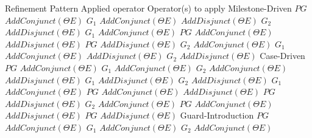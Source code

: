 
{
\setupTABLE[r][1][style=bold,align=middle]
\setupTABLE[c][1][align={middle,lohi}]
\setupTABLE[c][each][loffset=1pt,roffset=1pt]
\bTABLE															
\bTABLEhead																								
\bTR	\bTD	Refinement Pattern	\eTD	\bTD[nc=2]		Applied operator		\eTD						\bTD[nc=2]		Operator(s) to apply		\eTD						\eTR
\eTABLEhead																								
\bTABLEbody																					
\bTR	\bTD[nr=6]	\dontleavehmode{} Milestone-Driven 	\eTD	\bTD[nr=2]	$	PG	$	\eTD	\bTD	$	AddConjunct(\Theta E)	$	\eTD	\bTD	$	G_1	$	\eTD	\bTD	$	AddConjunct(\Theta E)	$	\eTD	\eTR
\bTR									\bTD	$	AddDisjunct(\Theta E)	$	\eTD	\bTD	$	G_2	$	\eTD	\bTD	$	AddDisjunct(\Theta E)	$	\eTD	\eTR
\bTR				\bTD[nr=2]	$	G_1	$	\eTD	\bTD	$	AddConjunct(\Theta E)	$	\eTD	\bTD	$	PG	$	\eTD	\bTD	$	AddConjunct(\Theta E)	$	\eTD	\eTR
\bTR									\bTD	$	AddDisjunct(\Theta E)	$	\eTD	\bTD	$	PG	$	\eTD	\bTD	$	AddDisjunct(\Theta E)	$	\eTD	\eTR
\bTR				\bTD[nr=2]	$	G_2	$	\eTD	\bTD	$	AddConjunct(\Theta E)	$	\eTD	\bTD	$	G_1	$	\eTD	\bTD	$	AddConjunct(\Theta E)	$	\eTD	\eTR
\bTR									\bTD	$	AddDisjunct(\Theta E)	$	\eTD	\bTD	$	G_2	$	\eTD	\bTD	$	AddDisjunct(\Theta E)	$	\eTD	\eTR
\bTR	\bTD[nr=8] \dontleavehmode{}	Case-Driven 		\eTD	\bTD[nr=4]	$	PG	$	\eTD	\bTD[nr=2]	$	AddConjunct(\Theta E)	$	\eTD	\bTD	$	G_1	$	\eTD	\bTD	$	AddConjunct(\Theta E)	$	\eTD	\eTR
\bTR														\bTD	$	G_2	$	\eTD	\bTD	$	AddConjunct(\Theta E)	$	\eTD	\eTR
\bTR									\bTD[nr=2]	$	AddDisjunct(\Theta E)	$	\eTD	\bTD	$	G_1	$	\eTD	\bTD	$	AddDisjunct(\Theta E)	$	\eTD	\eTR
\bTR														\bTD	$	G_2	$	\eTD	\bTD	$	AddDisjunct(\Theta E)	$	\eTD	\eTR
\bTR				\bTD[nr=2]	$	G_1	$	\eTD	\bTD	$	AddConjunct(\Theta E)	$	\eTD	\bTD	$	PG	$	\eTD	\bTD	$	AddConjunct(\Theta E)	$	\eTD	\eTR
\bTR									\bTD	$	AddDisjunct(\Theta E)	$	\eTD	\bTD	$	PG	$	\eTD	\bTD	$	AddDisjunct(\Theta E)	$	\eTD	\eTR
\bTR				\bTD[nr=2]	$	G_2	$	\eTD	\bTD	$	AddConjunct(\Theta E)	$	\eTD	\bTD	$	PG	$	\eTD	\bTD	$	AddConjunct(\Theta E)	$	\eTD	\eTR
\bTR									\bTD	$	AddDisjunct(\Theta E)	$	\eTD	\bTD	$	PG	$	\eTD	\bTD	$	AddDisjunct(\Theta E)	$	\eTD	\eTR
\bTR	\bTD[nr=13] \dontleavehmode{}	Guard-Introduction 	\eTD	\bTD[nr=4]	$	PG	$	\eTD	\bTD[nr=2]	$	AddConjunct(\Theta E)	$	\eTD	\bTD	$	G_1	$	\eTD	\bTD	$	AddConjunct(\Theta E)	$	\eTD	\eTR
\bTR														\bTD	$	G_2	$	\eTD	\bTD	$	AddConjunct(\Theta E)	$	\eTD	\eTR
}
